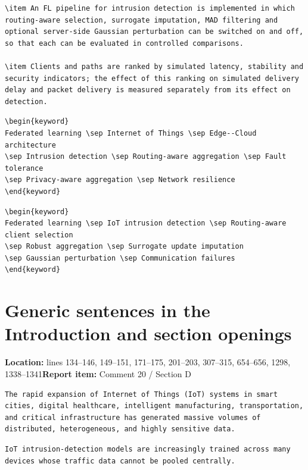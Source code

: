 \documentclass[10pt,a4paper]{article}
\newcommand{\issue}[3]{\section{#1}{\raggedright\noindent\textcolor{note}{\small\textbf{Location:} #2\quad\textbf{Report item:} #3}\par}\smallskip}
\begin{document}
\begin{after}
\begin{Verbatim}
\item An FL pipeline for intrusion detection is implemented in which
routing-aware selection, surrogate imputation, MAD filtering and
optional server-side Gaussian perturbation can be switched on and off,
so that each can be evaluated in controlled comparisons.

\item Clients and paths are ranked by simulated latency, stability and
security indicators; the effect of this ranking on simulated delivery
delay and packet delivery is measured separately from its effect on
detection.
\end{Verbatim}
\end{after}

\begin{before}[lines 119--128]
\begin{Verbatim}
\begin{keyword}
Federated learning \sep Internet of Things \sep Edge--Cloud architecture
\sep Intrusion detection \sep Routing-aware aggregation \sep Fault tolerance
\sep Privacy-aware aggregation \sep Network resilience
\end{keyword}
\end{Verbatim}
\end{before}

\begin{after}
\begin{Verbatim}
\begin{keyword}
Federated learning \sep IoT intrusion detection \sep Routing-aware client selection
\sep Robust aggregation \sep Surrogate update imputation
\sep Gaussian perturbation \sep Communication failures
\end{keyword}
\end{Verbatim}
\end{after}

\issue{Generic sentences in the Introduction and section openings}{lines 134--146, 149--151, 171--175, 201--203, 307--315, 654--656, 1298, 1338--1341}{Comment 20 / Section D}

\begin{before}[lines 134--137]
\begin{Verbatim}
The rapid expansion of Internet of Things (IoT) systems in smart
cities, digital healthcare, intelligent manufacturing, transportation,
and critical infrastructure has generated massive volumes of
distributed, heterogeneous, and highly sensitive data.
\end{Verbatim}
\end{before}
\begin{after}
\begin{Verbatim}
IoT intrusion-detection models are increasingly trained across many
devices whose traffic data cannot be pooled centrally.
\end{Verbatim}
\end{after}
\end{document}

